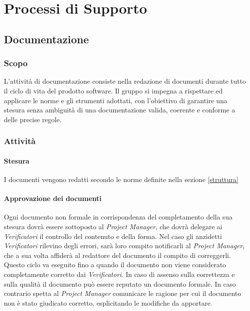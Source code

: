 \section{Processi di Supporto}


\subsection{Documentazione}
	
	\subsubsection{Scopo}
	L'attività di documentazione consiste nella redazione di documenti durante tutto il ciclo di vita del prodotto software. Il gruppo si impegna a rispettare ed applicare le norme e gli strumenti adottati, con l'obiettivo di garantire una stesura senza ambiguità di una documentazione valida, coerente e conforme a delle precise regole.
	
	\subsubsection{Attività}
	
	\paragraph{Stesura} \Spazio
	I documenti vengono redatti secondo le norme definite nella sezione \ref{struttura}
	
	\paragraph{Approvazione dei documenti} \Spazio
	Ogni documento non formale in corrispondenza del completamento della sua stesura dovrà essere sottoposto al \textit{Project Manager}, che dovrà delegare ai \textit{Verificatori} il controllo del contenuto e della forma. Nel caso gli anzidetti \textit{Verificatori} rilevino degli errori, sarà loro compito notificarli al \textit{Project Manager}, che a sua volta affiderà al redattore del documento il compito di correggerli. Questo ciclo va eseguito fino a quando il documento non viene considerato completamente corretto dai  \textit{Verificatori}. In caso di assenso sulla correttezza e sulla qualità il documento può essere reputato un documento formale. In caso contrario spetta al \textit{Project Manager} comunicare le ragione per cui il documento non è stato giudicato corretto, esplicitando le modifiche da apportare.
	
